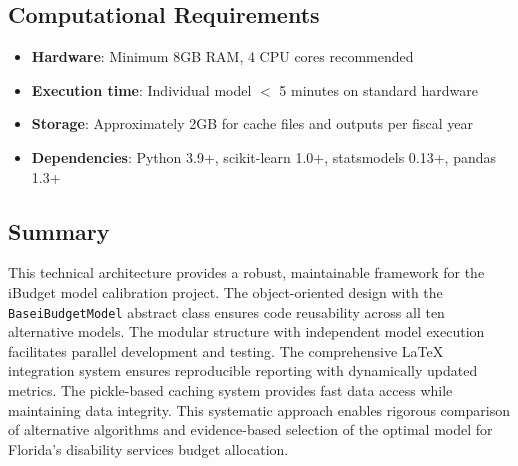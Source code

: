 \subsection{Computational Requirements}

\begin{itemize}
    \item \textbf{Hardware}: Minimum 8GB RAM, 4 CPU cores recommended
    \item \textbf{Execution time}: Individual model $<$ 5 minutes on standard hardware
    \item \textbf{Storage}: Approximately 2GB for cache files and outputs per fiscal year
    \item \textbf{Dependencies}: Python 3.9+, scikit-learn 1.0+, statsmodels 0.13+, pandas 1.3+
\end{itemize}

\subsection{Summary}

This technical architecture provides a robust, maintainable framework for the iBudget model calibration project. The object-oriented design with the \texttt{BaseiBudgetModel} abstract class ensures code reusability across all ten alternative models. The modular structure with independent model execution facilitates parallel development and testing. The comprehensive LaTeX integration system ensures reproducible reporting with dynamically updated metrics. The pickle-based caching system provides fast data access while maintaining data integrity. This systematic approach enables rigorous comparison of alternative algorithms and evidence-based selection of the optimal model for Florida's disability services budget allocation.


% 



